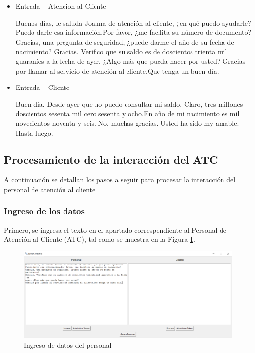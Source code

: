 \documentclass[twocolumn, fontsize=10pt]{article}
\begin{document}
\begin{itemize}

	\item Entrada – Atencion al Cliente
	
Buenos días, le saluda Joanna de atención al cliente, ¿en qué puedo ayudarle?
Puedo darle esa información.Por favor, ¿me facilita su número de documento?
Gracias, una pregunta de seguridad, ¿puede darme el año de su fecha de
nacimiento?
Gracias. Verifico que su saldo es de doscientos trienta mil guaraníes a la fecha de
ayer. ¿Algo más que pueda hacer por usted?
Gracias por llamar al servicio de atención al cliente.Que tenga un buen día.

	\item Entrada – Cliente
	
Buen dia. Desde ayer que no puedo consultar mi saldo.
Claro, tres millones doscientos sesenta mil cero sesenta y ocho.En año de mi nacimiento es mil novecientos noventa y seis.
No, muchas gracias. Usted ha sido my amable.
Hasta luego.

\end{itemize}

\subsection{Procesamiento de la interacción del ATC}
A continuación se detallan los pasos a seguir para procesar la interacción del personal de atención al cliente.

\subsubsection{Ingreso de los datos}
Primero, se ingresa el texto en el apartado correspondiente al Personal de Atención al Cliente (ATC), tal como se muestra en la Figura \ref{fig:graf_atc_paso1}.

\begin{figure}[h]
    \centering
    \includegraphics[width=\linewidth]{graficas/ATC_paso1.png}
    \caption{Ingreso de datos del personal}
    \label{fig:graf_atc_paso1}
\end{figure}
\end{document}
